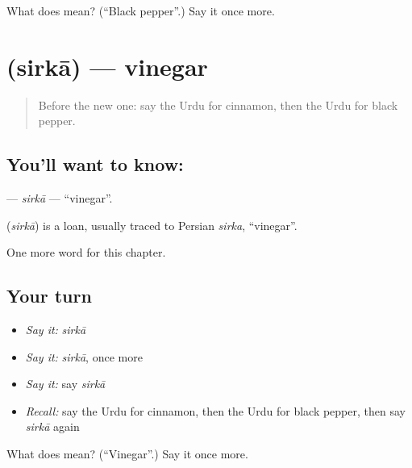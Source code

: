 \begin{tcolorbox}[breakable,colback=teal!4,colframe=teal!35!black,title={Before you move on}]
What does   mean? (\textquotedblleft{}Black pepper\textquotedblright{}.) Say it once more.
\end{tcolorbox}
\section[\texorpdfstring{\ur{سرکہ} (sirkā)}{سرکہ (sirkā)}]{ (sirkā) — vinegar}

\label{lesson:UR-C207-sirka}



\begin{quote}
Before the new one: say the Urdu for cinnamon, then the Urdu for black pepper.
\end{quote}

\subsection*{You'll want to know: }
\textbf{} — \emph{sirkā} — \textquotedblleft{}vinegar\textquotedblright{}.

\begin{cousinweb}
\textbf{} (\emph{sirkā}) is a loan, usually traced to Persian \emph{sirka}, \textquotedblleft{}vinegar\textquotedblright{}.
\end{cousinweb}

\begin{grammarlens}[title={What you've built}]
One more word for this chapter.
\end{grammarlens}

\subsection*{Your turn}
\begin{itemize}
\raggedright
  \item \emph{Say it:} \emph{sirkā}
  \item \emph{Say it:} \emph{sirkā}, once more
  \item \emph{Say it:} say \emph{sirkā}
  \item \emph{Recall:} say the Urdu for cinnamon, then the Urdu for black pepper, then say \emph{sirkā} again
\end{itemize}

\begin{tcolorbox}[breakable,colback=teal!4,colframe=teal!35!black,title={Before you move on}]
What does  mean? (\textquotedblleft{}Vinegar\textquotedblright{}.) Say it once more.
\end{tcolorbox}
